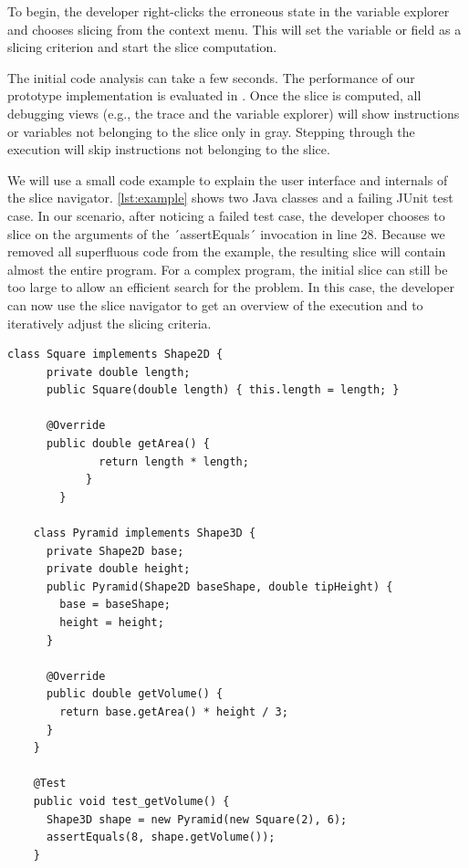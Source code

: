 ﻿\documentclass[
      english,
      ]{llncs}
\begin{document}

To begin, the developer right-clicks the erroneous state in the variable explorer and chooses slicing from the context menu.
This will set the variable or field as a slicing criterion and start the slice computation.

The initial code analysis can take a few seconds.
The performance of our prototype implementation is evaluated in  .
Once the slice is computed, all debugging views (e.g., the trace and the variable explorer) will show instructions or variables not belonging to the slice only in gray.
Stepping through the execution will skip instructions not belonging to the slice.

We will use a small code example to explain the user interface and internals of the slice navigator. 
\autoref{lst:example} shows two Java classes and a failing JUnit test case.
In our scenario, after noticing a failed test case, the developer chooses to slice on the arguments of the ´assertEquals´ invocation in line 28.
Because we removed all superfluous code from the example, the resulting slice will contain almost the entire program.
For a complex program, the initial slice can still be too large to allow an efficient search for the problem.
In this case, the developer can now use the slice navigator to get an overview of the execution and to iteratively adjust the slicing criteria.

\begin{lstlisting}[numberfirstline=true,firstnumber=1,label=lst:example,caption={Example program with a failing test case}]
  	class Square implements Shape2D {
  	  private double length;
  	  public Square(double length) { this.length = length; }
  	  
  	  @Override
  	  public double getArea() { 
			  return length * length; 
			}
		}
  	
  	class Pyramid implements Shape3D {
  	  private Shape2D base;
  	  private double height;
  	  public Pyramid(Shape2D baseShape, double tipHeight) {
  	    base = baseShape;
  	    height = height;
  	  }
  	  
  	  @Override
  	  public double getVolume() { 
  	    return base.getArea() * height / 3; 
  	  }
  	}
  	
    @Test
    public void test_getVolume() {
      Shape3D shape = new Pyramid(new Square(2), 6);
      assertEquals(8, shape.getVolume());
    }
\end{lstlisting}
\end{document}
